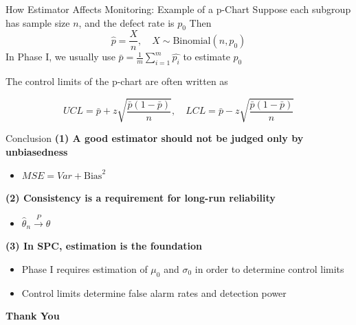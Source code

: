 \documentclass[aspectratio=169,12pt]{beamer}
\begin{document}
\begin{frame}{How Estimator Affects Monitoring: Example of a p-Chart}
    Suppose each subgroup has sample size $n$, and the defect rate is $p_0$
    Then $$\hat p=\frac{X}{n}, \quad X\sim\mathrm{Binomial}(n, p_0)$$
    In Phase I, we usually use $\bar{p}=\frac1m\sum^m_{i=1}\hat{p_i}$ to estimate $p_0$ 

    The control limits of the p-chart are often written as

    $$
    UCL=\bar p + z\sqrt{\frac{\bar p(1-\bar p)}{n}},
    \quad
    LCL=\bar p - z\sqrt{\frac{\bar p(1-\bar p)}{n}}
    $$
\end{frame}

\begin{frame}{Conclusion}
    \vspace{0.2cm}
    \textbf{(1) A good estimator should not be judged only by unbiasedness}
    \begin{itemize}
        \item $ MSE= Var+\mathrm{Bias}^2$
    \end{itemize}

    \vspace{0.8em}
    \textbf{(2) Consistency is a requirement for long-run reliability}
    \begin{itemize}
        \item $\hat{\theta}_n \xrightarrow{P} \theta$
    \end{itemize}

    \vspace{0.8em}
    \textbf{(3) In SPC, estimation is the foundation}
    \begin{itemize}
        \item Phase I requires estimation of $\mu_0$ and $\sigma_0$ in order to determine control limits
        \item Control limits determine false alarm rates and detection power
    \end{itemize}
    \vspace{0.8em}
\end{frame}

\begin{frame}
    \centering\Huge{\textbf{Thank You}}
\end{frame}
\end{document}
